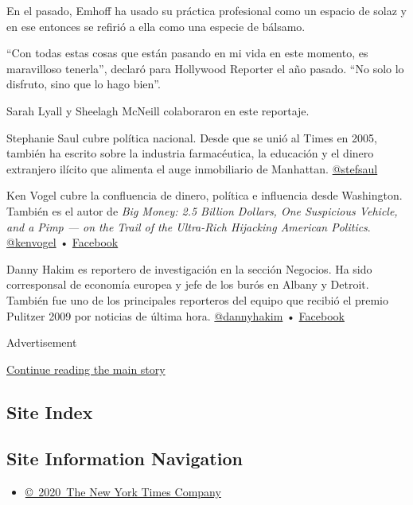En el pasado, Emhoff ha usado su práctica profesional como un espacio de
solaz y en ese entonces se refirió a ella como una especie de bálsamo.

``Con todas estas cosas que están pasando en mi vida en este momento, es
maravilloso tenerla'', declaró para Hollywood Reporter el año pasado.
``No solo lo disfruto, sino que lo hago bien''.

Sarah Lyall y Sheelagh McNeill colaboraron en este reportaje.

Stephanie Saul cubre política nacional. Desde que se unió al Times en
2005, también ha escrito sobre la industria farmacéutica, la educación y
el dinero extranjero ilícito que alimenta el auge inmobiliario de
Manhattan. \href{https://twitter.com/stefsaul}{@stefsaul}

Ken Vogel cubre la confluencia de dinero, política e influencia desde
Washington. También es el autor de \emph{Big Money: 2.5 Billion Dollars,
One Suspicious Vehicle, and a Pimp --- on the Trail of the Ultra-Rich
Hijacking American Politics}.
\href{https://twitter.com/kenvogel}{@kenvogel} •
\href{https://www.facebookcorewwwi.onion/vogel}{Facebook}

Danny Hakim es reportero de investigación en la sección Negocios. Ha
sido corresponsal de economía europea y jefe de los burós en Albany y
Detroit. También fue uno de los principales reporteros del equipo que
recibió el premio Pulitzer 2009 por noticias de última hora.
\href{https://twitter.com/dannyhakim}{@dannyhakim} •
\href{https://www.facebookcorewwwi.onion/danny.hakim.100}{Facebook}

Advertisement

\protect\hyperlink{after-bottom}{Continue reading the main story}

\hypertarget{site-index}{%
\subsection{Site Index}\label{site-index}}

\hypertarget{site-information-navigation}{%
\subsection{Site Information
Navigation}\label{site-information-navigation}}

\begin{itemize}
\tightlist
\item
  \href{https://help.nytimes3xbfgragh.onion/hc/en-us/articles/115014792127-Copyright-notice}{©~2020~The
  New York Times Company}
\end{itemize}

